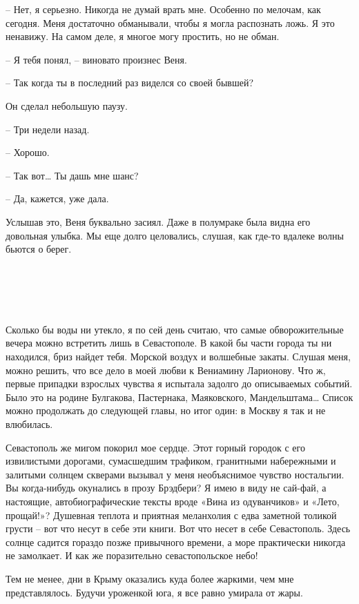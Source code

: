 \documentclass[
]{book}
\begin{document}
-- Нет, я серьезно. Никогда не думай врать мне. Особенно по мелочам, как сегодня. Меня достаточно обманывали, чтобы я могла распознать ложь. Я это ненавижу. На самом деле, я многое могу простить, но не обман.

-- Я тебя понял, -- виновато произнес Веня.

-- Так когда ты в последний раз виделся со своей бывшей?

Он сделал небольшую паузу.

-- Три недели назад.

-- Хорошо.

-- Так вот\ldots{} Ты дашь мне шанс?

-- Да, кажется, уже дала.

Услышав это, Веня буквально засиял. Даже в полумраке была видна его довольная улыбка. Мы еще долго целовались, слушая, как где-то вдалеке волны бьются о берег.

\hypertarget{chapter-11}{%
\chapter{~}\label{chapter-11}}

Сколько бы воды ни утекло, я по сей день считаю, что самые обворожительные вечера можно встретить лишь в Севастополе. В какой бы части города ты ни находился, бриз найдет тебя. Морской воздух и волшебные закаты. Слушая меня, можно решить, что все дело в моей любви к Вениамину Ларионову. Что ж, первые припадки взрослых чувства я испытала задолго до описываемых событий. Было это на родине Булгакова, Пастернака, Маяковского, Мандельштама\ldots{} Список можно продолжать до следующей главы, но итог один: в Москву я так и не влюбилась.

Севастополь же мигом покорил мое сердце. Этот горный городок с его извилистыми дорогами, сумасшедшим трафиком, гранитными набережными и залитыми солнцем скверами вызывал у меня необъяснимое чувство ностальгии. Вы когда-нибудь окунались в прозу Брэдбери? Я имею в виду не сай-фай, а настоящие, автобиографические тексты вроде «Вина из одуванчиков» и «Лето, прощай!»? Душевная теплота и приятная меланхолия с едва заметной толикой грусти -- вот что несут в себе эти книги. Вот что несет в себе Севастополь. Здесь солнце садится гораздо позже привычного времени, а море практически никогда не замолкает. И как же поразительно севастопольское небо!

Тем не менее, дни в Крыму оказались куда более жаркими, чем мне представлялось. Будучи уроженкой юга, я все равно умирала от жары.
\end{document}
